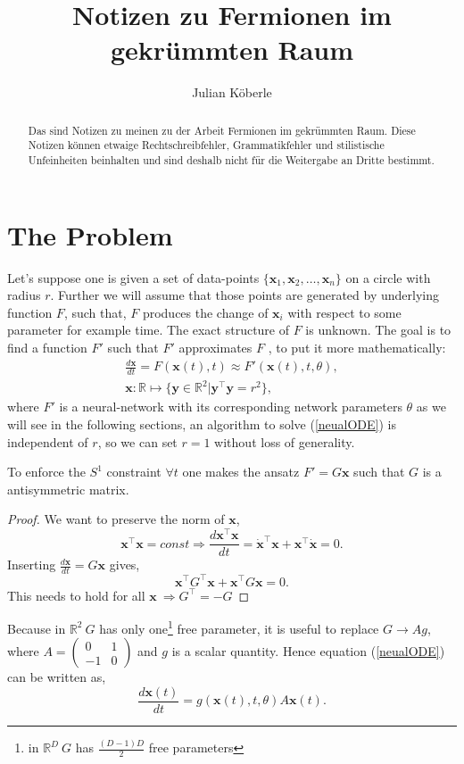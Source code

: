 \documentclass[12pt,a4paper]{article}
\author{Julian Köberle}
\title{Notizen zu Fermionen im gekrümmten Raum}
\begin{document}
\maketitle

\newcommand{\R}{\mathbb{R}}
\newcommand{\x}{\textbf{x}}
\newcommand{\y}{\textbf{y}}
\newcommand{\Lcal}{\mathcal{L}}
\newcommand{\at}{\textbf{a}^\top}
\newcommand{\n}{\textbf{n}^\top_\theta}
\newcommand{\A}{A_i^{\ j}}

\begin{abstract}
Das sind Notizen zu meinen zu der Arbeit Fermionen im gekrümmten Raum. Diese Notizen können etwaige Rechtschreibfehler, Grammatikfehler und stilistische Unfeinheiten beinhalten und sind deshalb nicht für die Weitergabe an Dritte bestimmt.
\end{abstract}

\tableofcontents 

\section{The Problem}
Let's suppose one is given a set of data-points $\{ \x_1, \x_2, \ldots , \x_n\}$ on a circle with radius $r$. Further we will assume that those points are generated by  underlying function $F$, such that, $F$ produces the change of $\x_i$ with respect to some parameter for example time. The exact structure of $F$ is unknown.
The goal is to find a function $F'$ such that $F'$ approximates $F$ , to put it more mathematically:
\begin{equation}
\begin{split}
\label{neualODE}
\frac{d\x}{dt} = F(\x(t),t) \approx F'(\x(t), t, \theta),
\\
\x : \R \mapsto \{\y \in \R^2 | \y^\top \y = r^2\},
\end{split}
\end{equation}where $F'$ is a neural-network with its corresponding network parameters $\theta$ as we will see in the following sections, an algorithm to solve (\ref{neualODE}) is independent of $r$, so we can set $r=1$ without loss of generality.

To enforce the $S^1$ constraint $\forall t$ one makes the ansatz $F' = G\x$ such that $G$ is a antisymmetric matrix.
\begin{proof} We want to preserve the norm of $\x$,
$$
\x^\top \x = const
\Rightarrow
\frac{d \x^\top \x}{dt} = \dot{\x}^\top \x + \x^\top \dot{\x} = 0.
$$
Inserting $\frac{d \x }{dt} = G \x$ gives,
$$
\x^\top G^\top \x + \x^\top G\x = 0.
$$
This needs to hold for all $\x \ \Rightarrow G^\top = - G $  
\end{proof} 
Because in $\R^2 \ G$ has only one\footnote{in $\R^D \ G$ has $\frac{(D-1)D}{2}$ free parameters} free parameter, it is useful to replace $G \rightarrow A g$,
where $A = \begin{pmatrix}
0 & 1 \\
-1 & 0
\end{pmatrix}$ 
and $g$ is a scalar quantity. Hence equation (\ref{neualODE}) can be written as,
\begin{equation}
\label{neualODE_2}
\frac{d\x(t)}{dt} = g(\x(t),t, \theta)A \x(t).
\end{equation}
\end{document}
